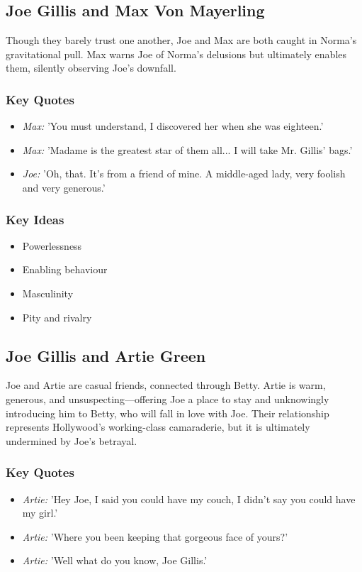 \documentclass[a4paper]{article}
\begin{document}
\subsection{Joe Gillis and Max Von Mayerling}
Though they barely trust one another, Joe and Max are both caught in Norma’s gravitational pull. Max warns Joe of Norma’s delusions but ultimately enables them, silently observing Joe’s downfall.

\subsubsection*{Key Quotes}
\begin{itemize}
    \item \textit{Max:} 'You must understand, I discovered her when she was eighteen.'
    \item \textit{Max:} 'Madame is the greatest star of them all... I will take Mr. Gillis’ bags.'
    \item \textit{Joe:} 'Oh, that. It’s from a friend of mine. A middle-aged lady, very foolish and very generous.'
\end{itemize}

\subsubsection*{Key Ideas}
\begin{itemize}
    \item Powerlessness
    \item Enabling behaviour
    \item Masculinity
    \item Pity and rivalry
\end{itemize}

\subsection{Joe Gillis and Artie Green}
Joe and Artie are casual friends, connected through Betty. Artie is warm, generous, and unsuspecting—offering Joe a place to stay and unknowingly introducing him to Betty, who will fall in love with Joe. Their relationship represents Hollywood's working-class camaraderie, but it is ultimately undermined by Joe’s betrayal.

\subsubsection*{Key Quotes}
\begin{itemize}
    \item \textit{Artie:} 'Hey Joe, I said you could have my couch, I didn’t say you could have my girl.'
    \item \textit{Artie:} 'Where you been keeping that gorgeous face of yours?'
    \item \textit{Artie:} 'Well what do you know, Joe Gillis.'
\end{itemize}
\end{document}
